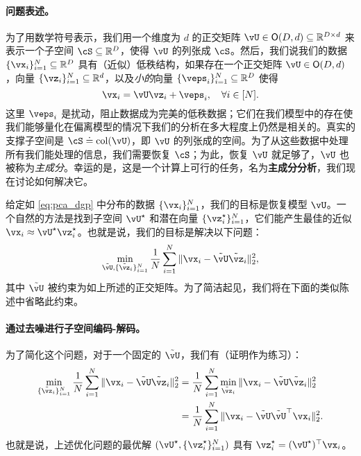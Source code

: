 \documentclass[../../book-main_zh.tex]{subfiles}
\begin{document}
\paragraph{问题表述。}
为了用数学符号表示，我们用一个维度为 \(d\) 的正交矩阵 \(\vU \in \O(D, d) \subseteq \R^{D \times d}\) 来表示一个子空间 \(\cS \subseteq \R^{D}\)，使得 \(\vU\) 的列张成 \(\cS\)。然后，我们说我们的数据 \(\{\vx_{i}\}_{i = 1}^{N} \subseteq \R^{D}\) 具有（近似）低秩结构，如果存在一个正交矩阵 \(\vU \in \O(D, d)\)，向量 \(\{\vz_{i}\}_{i = 1}^{N} \subseteq \R^{d}\)，以及\textit{小的}向量 \(\{\veps_{i}\}_{i = 1}^{N} \subseteq \R^{D}\) 使得
\begin{equation}\label{eq:pca_dgp}
    \vx_{i} = \vU\vz_{i} + \veps_{i}, \quad \forall i \in [N].
\end{equation}
这里 \(\veps_{i}\) 是扰动，阻止数据成为完美的低秩数据；它们在我们模型中的存在使我们能够量化在偏离模型的情况下我们的分析在多大程度上仍然是相关的。真实的支撑子空间是 \(\cS \doteq \mathop{\mathrm{col}}(\vU)\)，即 \(\vU\) 的列张成的空间。为了从这些数据中处理所有我们能处理的信息，我们需要恢复 \(\cS\)；为此，恢复 \(\vU\) 就足够了，\(\vU\) 也被称为\textit{主成分}。幸运的是，这是一个计算上可行的任务，名为\textbf{主成分分析}，我们现在讨论如何解决它。

给定如 \eqref{eq:pca_dgp} 中分布的数据 \(\{\vx_{i}\}_{i = 1}^{N}\)，我们的目标是恢复模型 \(\vU\)。一个自然的方法是找到子空间 \(\vU^{\star}\) 和潜在向量 \(\{\vz_{i}^{\star}\}_{i = 1}^{N}\)，它们能产生最佳的近似 \(\vx_{i} \approx \vU^{\star}\vz_{i}^{\star}\)。也就是说，我们的目标是解决以下问题：
\begin{equation}\label{eq:pca_sparse_recovery_problem}
    \min_{\tilde{\vU}, \{\tilde{\vz}_{i}\}_{i = 1}^{N}}\frac{1}{N}\sum_{i = 1}^{N}\norm{\vx_{i} - \tilde{\vU}\tilde{\vz}_{i}}_{2}^{2},
\end{equation}
其中 \(\tilde{\vU}\) 被约束为如上所述的正交矩阵。为了简洁起见，我们将在下面的类似陈述中省略此约束。

\paragraph{通过去噪进行子空间编码-解码。}
为了简化这个问题，对于一个固定的 \(\tilde{\vU}\)，我们有（证明作为练习）：
\begin{align}
    \min_{\{\tilde{\vz}_{i}\}_{i = 1}^{N}}\frac{1}{N}\sum_{i = 1}^{N}\norm{\vx_{i} - \tilde{\vU}\tilde{\vz}_{i}}_{2}^{2} 
    &= \frac{1}{N}\sum_{i = 1}^{N}\min_{\tilde{\vz}_{i}}\norm{\vx_{i} - \tilde{\vU}\tilde{\vz}_{i}}_{2}^{2} \\
    &= \frac{1}{N}\sum_{i = 1}^{N}\norm{\vx_{i} - \tilde{\vU}\tilde{\vU}^{\top}\vx_{i}}_{2}^{2}. 
\end{align}
也就是说，上述优化问题的最优解 \((\vU^{\star}, \{\vz_{i}^{\star}\}_{i = 1}^{N})\) 具有 $\vz_i^{\star} = (\vU^{\star})^\top\vx_i$。
\end{document}
